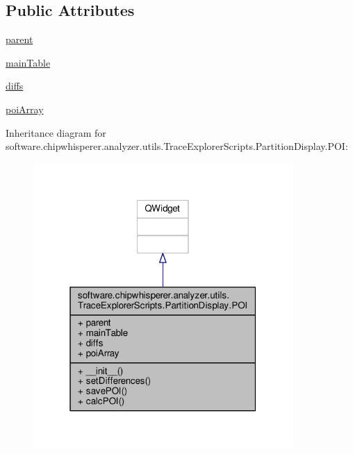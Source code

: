\subsection*{Public Attributes}
\begin{DoxyCompactItemize}
\item 
\hyperlink{classsoftware_1_1chipwhisperer_1_1analyzer_1_1utils_1_1TraceExplorerScripts_1_1PartitionDisplay_1_1POI_a5365ab9885cd9f79ca294ebd0a48fdda}{parent}
\item 
\hyperlink{classsoftware_1_1chipwhisperer_1_1analyzer_1_1utils_1_1TraceExplorerScripts_1_1PartitionDisplay_1_1POI_a7fe266919c72a3e1dd148b0eebf63fc7}{main\+Table}
\item 
\hyperlink{classsoftware_1_1chipwhisperer_1_1analyzer_1_1utils_1_1TraceExplorerScripts_1_1PartitionDisplay_1_1POI_a82aa66ff95bc2a0a00bf0462ccb813d6}{diffs}
\item 
\hyperlink{classsoftware_1_1chipwhisperer_1_1analyzer_1_1utils_1_1TraceExplorerScripts_1_1PartitionDisplay_1_1POI_adbe8e862b81ccc918b44d82cb1f3fe6d}{poi\+Array}
\end{DoxyCompactItemize}


Inheritance diagram for software.\+chipwhisperer.\+analyzer.\+utils.\+Trace\+Explorer\+Scripts.\+Partition\+Display.\+P\+O\+I\+:\nopagebreak
\begin{figure}[H]
\begin{center}
\leavevmode
\includegraphics[width=280pt]{da/d3c/classsoftware_1_1chipwhisperer_1_1analyzer_1_1utils_1_1TraceExplorerScripts_1_1PartitionDisplay_1_1POI__inherit__graph}
\end{center}
\end{figure}


